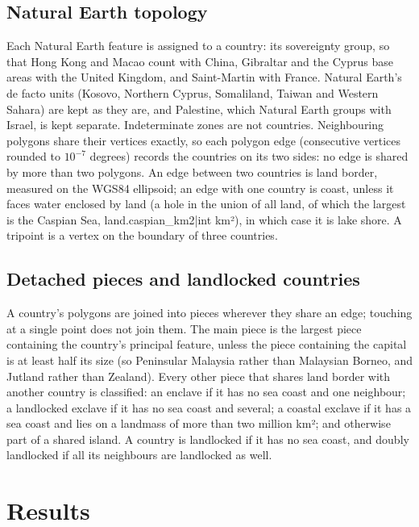 \documentclass[11pt,a4paper]{article}
\begin{document}
\subsection{Natural Earth topology}
Each Natural Earth feature is assigned to a country: its sovereignty group, so that Hong Kong and Macao count with China, Gibraltar and the Cyprus base areas with the United Kingdom, and Saint-Martin with France. Natural Earth's de facto units (Kosovo, Northern Cyprus, Somaliland, Taiwan and Western Sahara) are kept as they are, and Palestine, which Natural Earth groups with Israel, is kept separate. Indeterminate zones are not countries. Neighbouring polygons share their vertices exactly, so each polygon edge (consecutive vertices rounded to $10^{-7}$ degrees) records the countries on its two sides: no edge is shared by more than two polygons. An edge between two countries is land border, measured on the WGS84 ellipsoid; an edge with one country is coast, unless it faces water enclosed by land (a hole in the union of all land, of which the largest is the Caspian Sea, {{land.caspian_km2|int}} km²), in which case it is lake shore. A tripoint is a vertex on the boundary of three countries.

\subsection{Detached pieces and landlocked countries}
A country's polygons are joined into pieces wherever they share an edge; touching at a single point does not join them. The main piece is the largest piece containing the country's principal feature, unless the piece containing the capital is at least half its size (so Peninsular Malaysia rather than Malaysian Borneo, and Jutland rather than Zealand). Every other piece that shares land border with another country is classified: an enclave if it has no sea coast and one neighbour; a landlocked exclave if it has no sea coast and several; a coastal exclave if it has a sea coast and lies on a landmass of more than two million km²; and otherwise part of a shared island. A country is landlocked if it has no sea coast, and doubly landlocked if all its neighbours are landlocked as well.

\section{Results}
\end{document}

